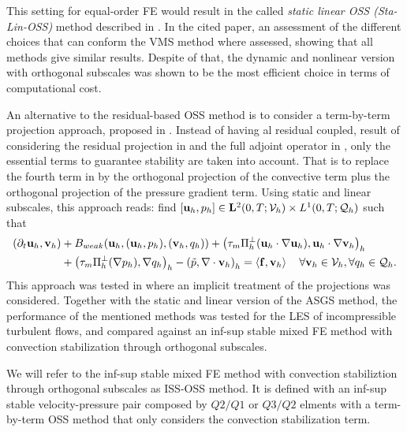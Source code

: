 This setting for equal-order FE would result in the called \textit{static linear OSS (Sta-Lin-OSS)} method described in \cite{colomes_assessment_2015}. In the cited paper, an assessment of the different choices that can conform the VMS method where assessed, showing that all methods give similar results.  Despite of that, the dynamic and nonlinear version with orthogonal subscales was shown to be the most efficient choice in terms of computational cost.

An alternative to the residual-based OSS method is to consider a term-by-term projection approach, proposed in \cite{codina_analysis_2008}. Instead of having al residual coupled, result of considering the residual projection in  and the full adjoint operator in , only the essential terms to guarantee stability are taken into account. That is to replace the fourth term in  by the orthogonal projection of the convective term plus the orthogonal projection of the pressure gradient term. Using static and linear subscales, this approach reads: find 
$[{\bf u}_h,p_h]\in\mathbf{L}^2(0,T;\mathcal{V}_{h})\times L^1(0,T;\mathcal{Q}_{h})$ such that
\begin{align}
\label{eq-C7_NS_vms_tbtoss}
(\partial_t{\bf u}_h,{\bf v}_h)&+B_{weak}({\bf u}_h,({\bf u}_h,p_h),({\bf v}_h,q_h))+\left(\tau_m\Pi_h^\perp({\bf u}_h\cdot\nabla{\bf u}_h),{\bf u}_h\cdot\nabla{\bf v}_h\right)_h\\\nonumber
&+\left(\tau_m\Pi_h^\perp(\nabla p_h),\nabla q_h\right)_h-\left(\tilde{p},\nabla\cdot{\bf v}_h\right)_h=\left<{\bf f},{\bf v}_h\right>
\quad\forall{\bf v}_h\in\mathcal{V}_{h},\forall q_h\in\mathcal{Q}_{h}.
\end{align}
This approach was tested in \cite{colomes_mixed} where an implicit treatment of the projections was considered. Together with the static and linear version of the ASGS method, the performance of the mentioned methods was tested for the LES of incompressible turbulent flows, and compared against an inf-sup stable mixed FE method with convection stabilization through orthogonal subscales.

We will refer to the inf-sup stable mixed FE method with convection stabiliztion through orthogonal subscales as ISS-OSS method. It is defined with an inf-sup stable velocity-pressure pair composed by $ Q2/Q1 $ or $ Q3/Q2 $ elments with a term-by-term OSS method that only considers the convection stabilization term.

